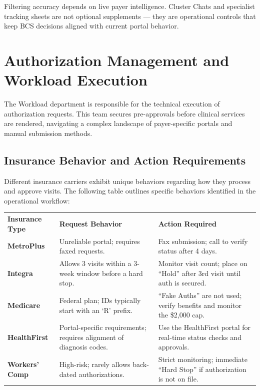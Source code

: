 \documentclass[11pt,a4paper]{article}
\begin{document}
\begin{tcolorbox}[rulebox,title={Knowledge Management Principle}]
Filtering accuracy depends on live payer intelligence. Cluster Chats and specialist tracking sheets are not optional supplements --- they are operational controls that keep BCS decisions aligned with current portal behavior.
\end{tcolorbox}


\section{Authorization Management and Workload Execution}

The Workload department is responsible for the technical execution of authorization requests. This team secures pre-approvals before clinical services are rendered, navigating a complex landscape of payer-specific portals and manual submission methods.

\subsection{Insurance Behavior and Action Requirements}

Different insurance carriers exhibit unique behaviors regarding how they process and approve visits. The following table outlines specific behaviors identified in the operational workflow:

\begin{tcolorbox}[infobox,title={Insurance Behavior Matrix}]
\small
\begin{tabularx}{\linewidth}{L{2.4cm} X L{3.4cm}}
  \color{white}\textbf{Insurance Type} & \color{white}\textbf{Request Behavior} & \color{white}\textbf{Action Required} \\
  \textbf{MetroPlus}
    & Unreliable portal; requires faxed requests.
    & Fax submission; call to verify status after 4 days. \\
  \textbf{Integra}
    & Allows 3 visits within a 3-week window before a hard stop.
    & Monitor visit count; place on ``Hold'' after 3rd visit until auth is secured. \\
  \textbf{Medicare}
    & Federal plan; IDs typically start with an `R' prefix.
    & ``Fake Auths'' are not used; verify benefits and monitor the \$2{,}000 cap. \\
  \textbf{HealthFirst}
    & Portal-specific requirements; requires alignment of diagnosis codes.
    & Use the HealthFirst portal for real-time status checks and approvals. \\
  \textbf{Workers' Comp}
    & High-risk; rarely allows back-dated authorizations.
    & Strict monitoring; immediate ``Hard Stop'' if authorization is not on file. \\
\end{tabularx}
\end{tcolorbox}
\end{document}
